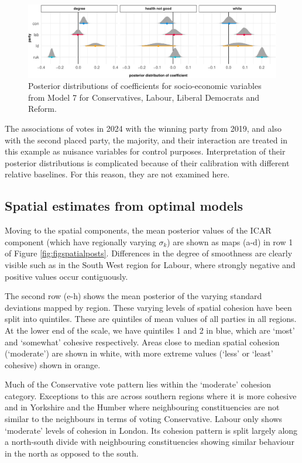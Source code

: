 \documentclass[webpdf,large,contemporary,namedate]{oup-authoring-template}
\theoremstyle{thmstyleone}
\theoremstyle{thmstyletwo}
\theoremstyle{thmstylethree}
\begin{document}
\begin{figure}[th]

{\centering \includegraphics[width=0.85\linewidth]{jrss_resubmission_files/figure-latex/figsocecposts-1} 

}

\caption{Posterior distributions of coefficients for socio-economic variables from Model 7 for Conservatives, Labour, Liberal Democrats and Reform.}\label{fig:figsocecposts}
\end{figure}

The associations of votes in 2024 with the winning party from 2019, and
also with the second placed party, the majority, and their interaction
are treated in this example as nuisance variables for control purposes.
Interpretation of their posterior distributions is complicated because
of their calibration with different relative baselines. For this reason,
they are not examined here.

\subsection{Spatial estimates from optimal
models}\label{spatial-estimates-from-optimal-models}

Moving to the spatial components, the mean posterior values of the ICAR
component (which have regionally varying \(\sigma_k\)) are shown as maps
(a-d) in row 1 of Figure \ref{fig:figspatialposts}. Differences in the
degree of smoothness are clearly visible such as in the South West
region for Labour, where strongly negative and positive values occur
contiguously.

The second row (e-h) shows the mean posterior of the varying standard
deviations mapped by region. These varying levels of spatial cohesion
have been split into quintiles. These are quintiles of mean values of
all parties in all regions. At the lower end of the scale, we have
quintiles 1 and 2 in blue, which are `most' and `somewhat' cohesive
respectively. Areas close to median spatial cohesion (`moderate') are
shown in white, with more extreme values (`less' or `least' cohesive)
shown in orange.

Much of the Conservative vote pattern lies within the `moderate'
cohesion category. Exceptions to this are across southern regions where
it is more cohesive and in Yorkshire and the Humber where neighbouring
constituencies are not similar to the neighbours in terms of voting
Conservative. Labour only shows `moderate' levels of cohesion in London.
Its cohesion pattern is split largely along a north-south divide with
neighbouring constituencies showing similar behaviour in the north as
opposed to the south.
\end{document}
